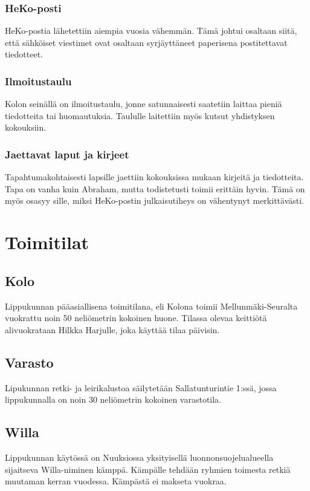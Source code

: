 \documentclass[a4paper, 12pt, finnish]{report} %
\begin{document}
\subsubsection{HeKo-posti}
HeKo-postia lähetettiin aiempia vuosia vähemmän. Tämä johtui osaltaan siitä, että sähköiset viestimet ovat osaltaan syrjäyttäneet paperisena postitettavat tiedotteet.
\subsubsection{Ilmoitustaulu}
Kolon seinällä on ilmoitustaulu, jonne satunnaisesti saatetiin laittaa pieniä tiedotteita tai huomautuksia. Taululle laitettiin myös kutsut yhdistyksen kokouksiin.
\subsubsection{Jaettavat laput ja kirjeet}
Tapahtumakohtaisesti lapsille jaettiin kokouksissa mukaan kirjeitä ja tiedotteita. Tapa on vanha kuin Abraham, mutta todistetusti toimii erittäin hyvin. Tämä on myös osasyy sille, miksi HeKo-postin julkaisutiheys on vähentynyt merkittävästi.
\newpage
\section{Toimitilat}
\subsection{Kolo}
Lippukunnan pääasiallisena toimitilana, eli Kolona toimii Mellunmäki-Seuralta vuokrattu noin 50 neliömetrin kokoinen huone. Tilassa olevaa keittiötä alivuokrataan Hilkka Harjulle, joka käyttää tilaa päivisin.
\subsection{Varasto}
Lipukunnan retki- ja leirikalustoa säilytetään Sallatunturintie 1:ssä, jossa lippukunnalla on noin 30 neliömetrin kokoinen varastotila. 
\subsection{Willa}
Lippukunnan käytössä on Nuuksiossa yksityisellä luonnonsuojelualueella sijaitseva Willa-niminen kämppä. Kämpälle tehdään ryhmien toimesta retkiä muutaman kerran vuodessa. Kämpästä ei makseta vuokraa.
\newpage
\end{document}
